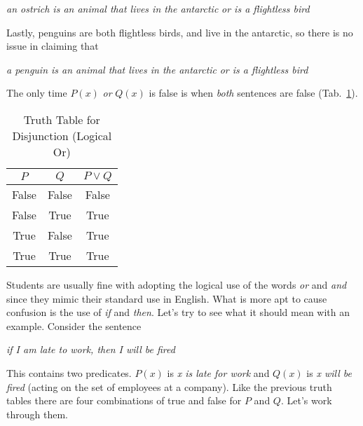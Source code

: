             \begin{center}
                \textit{an ostrich is an animal that lives in the antarctic}
                \textit{or is a flightless bird}
            \end{center}
            Lastly, penguins are both flightless birds, and live in the
            antarctic, so there is no issue in claiming that
            \begin{center}
                \textit{a penguin is an animal that lives in the antarctic}
                \textit{or is a flightless bird}
            \end{center}
            The only time $P(x)$ \textit{or} $Q(x)$ is false is when
            \textit{both} sentences are false
            (Tab.~\ref{tab:truth_table_disjunction}).
            \begin{table}[H]
                \centering
                \begin{tabular}{c | c | c}
                    $P$&$Q$&$P\lor{Q}$\\
                    \hline
                    False&False&False\\
                    \hline
                    False&True&True\\
                    \hline
                    True&False&True\\
                    \hline
                    True&True&True
                \end{tabular}
                \caption{Truth Table for Disjunction (Logical Or)}
                \label{tab:truth_table_disjunction}
            \end{table}
            Students are usually fine with adopting the logical use of the
            words \textit{or} and \textit{and} since they mimic their standard
            use in English. What is more apt to cause confusion is the use of
            \textit{if} and \textit{then}. Let's try to see what it should mean
            with an example. Consider the sentence
            \begin{center}
                \textit{if I am late to work, then I will be fired}
            \end{center}
            This contains two predicates. $P(x)$ is \textit{x is late for work}
            and $Q(x)$ is \textit{x will be fired} (acting on the set of
            employees at a company). Like the previous truth tables there are
            four combinations of true and false for $P$ and $Q$. Let's work
            through them.
